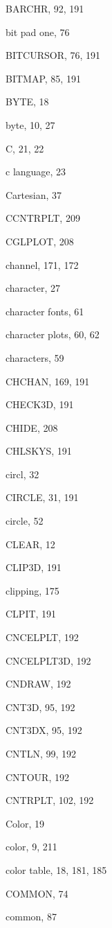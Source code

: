 \begin{theindex}
  \indexspace

  \item BARCHR, 92, 191
  \item bit pad one, 76
  \item BITCURSOR, 76, 191
  \item BITMAP, 85, 191
  \item BYTE, 18
  \item byte, 10, 27

  \indexspace

  \item C, 21, 22
  \item c language, 23
  \item Cartesian, 37
  \item CCNTRPLT, 209
  \item CGLPLOT, 208
  \item channel, 171, 172
  \item character, 27
  \item character fonts, 61
  \item character plots, 60, 62
  \item characters, 59
  \item CHCHAN, 169, 191
  \item CHECK3D, 191
  \item CHIDE, 208
  \item CHLSKYS, 191
  \item circl, 32
  \item CIRCLE, 31, 191
  \item circle, 52
  \item CLEAR, 12
  \item CLIP3D, 191
  \item clipping, 175
  \item CLPIT, 191
  \item CNCELPLT, 192
  \item CNCELPLT3D, 192
  \item CNDRAW, 192
  \item CNT3D, 95, 192
  \item CNT3DX, 95, 192
  \item CNTLN, 99, 192
  \item CNTOUR, 192
  \item CNTRPLT, 102, 192
  \item Color, 19
  \item color, 9, 211
  \item color table, 18, 181, 185
  \item COMMON, 74
  \item common, 87

\end{theindex}

